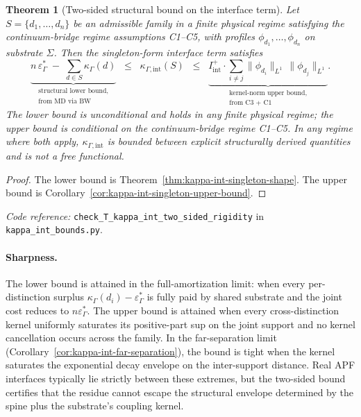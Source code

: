 \documentclass[11pt]{article}
\newtheorem{theorem}{Theorem}[section]
\newcommand{\coderef}[2]{\smallskip\noindent\textit{Code reference:} \texttt{#1} in \texttt{#2}.}
\begin{document}
\begin{theorem}[Two-sided structural bound on the interface term]\label{thm:kappa-int-two-sided-bound}
Let $S = \{d_1, \ldots, d_n\}$ be an admissible family in a finite physical regime satisfying the continuum-bridge regime assumptions C1--C5, with profiles $\phi_{d_1}, \ldots, \phi_{d_n}$ on substrate $\Sigma$.  Then the singleton-form interface term satisfies
\[
    \underbrace{n\,\varepsilon^*_\Gamma \;-\; \sum_{d\in S}\kappa_\Gamma(d)}_{\substack{\text{structural lower bound,}\\ \text{from MD via BW}}}
    \;\;\le\;\;
    \kappa_{\Gamma,\mathrm{int}}(S)
    \;\;\le\;\;
    \underbrace{I_{\mathrm{int}}^+ \cdot \!\!\sum_{i \neq j} \!\!\|\phi_{d_i}\|_{L^1}\,\|\phi_{d_j}\|_{L^1}}_{\substack{\text{kernel-norm upper bound,}\\ \text{from C3 + C1}}}.
\]
The lower bound is unconditional and holds in any finite physical regime; the upper bound is conditional on the continuum-bridge regime C1--C5.  In any regime where both apply, $\kappa_{\Gamma,\mathrm{int}}$ is bounded between explicit structurally derived quantities and is not a free functional.
\end{theorem}
\begin{proof}
The lower bound is Theorem~\ref{thm:kappa-int-singleton-shape}.  The upper bound is Corollary~\ref{cor:kappa-int-singleton-upper-bound}.
\end{proof}
\coderef{check\_T\_kappa\_int\_two\_sided\_rigidity}{kappa\_int\_bounds.py}

\paragraph{Sharpness.}
The lower bound is attained in the full-amortization limit: when every per-distinction surplus $\kappa_\Gamma(d_i) - \varepsilon^*_\Gamma$ is fully paid by shared substrate and the joint cost reduces to $n\varepsilon^*_\Gamma$.  The upper bound is attained when every cross-distinction kernel uniformly saturates its positive-part sup on the joint support and no kernel cancellation occurs across the family.  In the far-separation limit (Corollary~\ref{cor:kappa-int-far-separation}), the bound is tight when the kernel saturates the exponential decay envelope on the inter-support distance.  Real APF interfaces typically lie strictly between these extremes, but the two-sided bound certifies that the residue cannot escape the structural envelope determined by the spine plus the substrate's coupling kernel.
\end{document}
